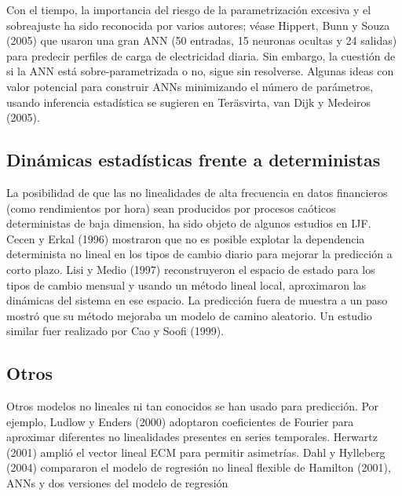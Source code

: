 \documentclass{llncs}
\begin{document}
Con el tiempo, la importancia del riesgo de la parametrización excesiva y el sobreajuste ha sido reconocida por varios autores; véase Hippert, Bunn y Souza (2005) que usaron una gran ANN (50 entradas, 15 neuronas ocultas y 24 salidas) para predecir perfiles de carga de electricidad diaria. Sin embargo, la cuestión de si la ANN está sobre-parametrizada o no, sigue sin resolverse. Algunas ideas con valor potencial para construir ANNs minimizando el número de parámetros, usando inferencia estadística se sugieren en Teräsvirta, van Dijk y Medeiros (2005).

\subsection{Dinámicas estadísticas frente a deterministas}
La posibilidad de que las no linealidades de alta frecuencia en datos financieros (como rendimientos por hora) sean producidos por procesos caóticos deterministas de baja dimension, ha sido objeto de algunos estudios en IJF. Cecen y Erkal (1996) mostraron que no es posible explotar la dependencia determinista no lineal en los tipos de cambio diario para mejorar la predicción a corto plazo. Lisi y Medio (1997) reconstruyeron el espacio de estado para los tipos de cambio mensual y usando un método lineal local, aproximaron las dinámicas del sistema en ese espacio. La predicción fuera de muestra a un paso mostró que su método mejoraba un modelo de camino aleatorio. Un estudio similar fuer realizado por Cao y Soofi (1999).

\subsection{Otros}
Otros modelos no lineales ni tan conocidos se han usado para predicción. Por ejemplo, Ludlow y Enders (2000) adoptaron coeficientes de Fourier para aproximar diferentes no linealidades presentes en series temporales. Herwartz (2001) amplió el vector lineal ECM para permitir asimetrías. Dahl y Hylleberg (2004) compararon el modelo de regresión no lineal flexible de Hamilton (2001), ANNs y dos versiones del modelo de regresión 








\end{document}
